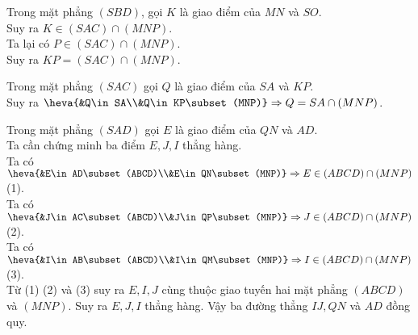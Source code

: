 \begin{bt}
{\begin{listEX}[1]
	\item Trong mặt phẳng $(SBD)$, gọi $K$ là giao điểm của $MN$ và $SO$.\\
	 Suy ra  $K\in (SAC)\cap (MNP)$.\\
	Ta lại có  $P\in (SAC)\cap (MNP)$.\\
	Suy ra $KP=(SAC)\cap(MNP)$.
	\item Trong mặt phẳng $(SAC)$ gọi $Q$ là giao điểm của $SA$ và $KP$.\\
	Suy ra $\heva{&Q\in SA\\&Q\in KP\subset (MNP)}\Rightarrow Q=SA\cap (MNP)$.
	\item Trong mặt phẳng $(SAD)$ gọi $E$ là giao điểm của $QN$ và $AD$.\\
	Ta cần chứng minh ba điểm $E, J, I $ thẳng hàng.\\
	Ta có $\heva{&E\in AD\subset (ABCD)\\&E\in QN\subset(MNP)}\Rightarrow E\in (ABCD)\cap (MNP)$\quad (1).\\
	Ta có $\heva{&J\in AC\subset (ABCD)\\&J\in QP\subset(MNP)}\Rightarrow J\in (ABCD)\cap (MNP)$\quad (2).\\
	Ta có $\heva{&I\in AB\subset (ABCD)\\&I\in QM\subset(MNP)}\Rightarrow I\in (ABCD)\cap (MNP)$\quad (3).\\
	Từ (1) (2) và (3) suy ra $E, I, J$ cùng thuộc giao tuyến hai mặt phẳng $(ABCD)$ và $(MNP)$. Suy ra $E, J, I $ thẳng hàng. Vậy ba đường thẳng $IJ, QN$ và $AD$ đồng quy.
\end{listEX}
}
\end{bt}

